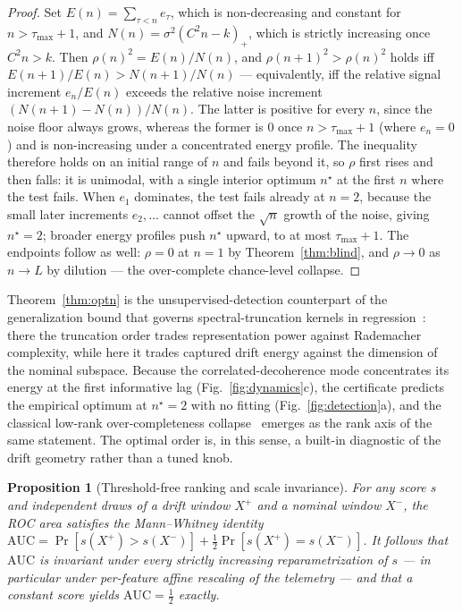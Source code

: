 \documentclass[
  aps,
  prresearch,
  reprint,
  amsmath,
  amssymb,
  nofootinbib,
  floatfix,
]{revtex4-2}
\newtheorem{proposition}[theorem]{Proposition}
\begin{document}
\begin{proof}
Set $E(n)=\sum_{\tau<n}e_\tau$, which is non-decreasing and constant for
$n>\tau_{\max}+1$, and $N(n)=\sigma^2(C^2 n-k)_+$, which is strictly increasing once
$C^2 n>k$. Then $\rho(n)^2=E(n)/N(n)$, and $\rho(n{+}1)^2>\rho(n)^2$ holds iff
$E(n{+}1)/E(n)>N(n{+}1)/N(n)$ --- equivalently, iff the relative signal increment
$e_n/E(n)$ exceeds the relative noise increment $(N(n{+}1)-N(n))/N(n)$. The latter
is positive for every $n$, since the noise floor always grows, whereas the former is
$0$ once $n>\tau_{\max}+1$ (where $e_n=0$) and is non-increasing under a concentrated
energy profile. The inequality therefore holds on an initial range of $n$ and fails
beyond it, so $\rho$ first rises and then falls: it is unimodal, with a single
interior optimum $n^\star$ at the first $n$ where the test fails. When $e_1$
dominates, the test fails already at $n{=}2$, because the small later increments
$e_2,\dots$ cannot offset the $\sqrt{n}$ growth of the noise, giving $n^\star=2$;
broader energy profiles push $n^\star$ upward, to at most $\tau_{\max}+1$. The
endpoints follow as well: $\rho=0$ at $n{=}1$ by Theorem~\ref{thm:blind}, and
$\rho\to0$ as $n\to L$ by dilution --- the over-complete chance-level collapse.
\end{proof}

\noindent Theorem~\ref{thm:optn} is the unsupervised-detection counterpart of the
generalization bound that governs spectral-truncation kernels in
regression~\citep{hashimoto2024spectral}: there the truncation order trades
representation power against Rademacher complexity, while here it trades captured
drift energy against the dimension of the nominal subspace. Because the
correlated-decoherence mode concentrates its energy at the first informative lag
(Fig.~\ref{fig:dynamics}c), the certificate predicts the empirical optimum at
$n^\star{=}2$ with no fitting (Fig.~\ref{fig:detection}a), and the classical
low-rank over-completeness collapse~\citep{malhotra2016lstmad} emerges as the rank
axis of the same statement. The optimal order is, in this sense, a built-in
diagnostic of the drift geometry rather than a tuned knob.

\begin{proposition}[Threshold-free ranking and scale invariance]
\label{prop:auc}
For any score $s$ and independent draws of a drift window $X^{+}$ and a nominal
window $X^{-}$, the ROC area satisfies the Mann--Whitney identity
$\mathrm{AUC}=\Pr[s(X^{+})>s(X^{-})]+\tfrac12\Pr[s(X^{+})=s(X^{-})]$.
It follows that $\mathrm{AUC}$ is invariant under every strictly increasing
reparametrization of $s$ --- in particular under per-feature affine rescaling of the
telemetry --- and that a constant score yields $\mathrm{AUC}=\tfrac12$ exactly.
\end{proposition}
\end{document}
